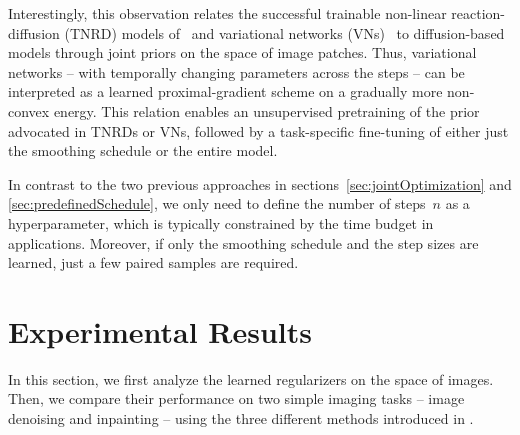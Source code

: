 \documentclass{article} %
\theoremstyle{plain}
\theoremstyle{definition}
\theoremstyle{remark}
\begin{document}
Interestingly, this observation relates the successful trainable non-linear reaction-diffusion (TNRD) models of~\citet{ChPo16} and variational networks (VNs)~\citep{KoKl17,HaKl18,EfKo20} to diffusion-based models through joint priors on the space of image patches.
Thus, variational networks -- with temporally changing parameters across the steps -- can be interpreted as a learned proximal-gradient scheme on a gradually more non-convex energy.
This relation enables an unsupervised pretraining of the prior advocated in TNRDs or VNs, followed by a task-specific fine-tuning of either just the smoothing schedule or the entire model.

In contrast to the two previous approaches in sections~\ref{sec:jointOptimization} and \ref{sec:predefinedSchedule}, we only need to define the number of steps~$n$ as a hyperparameter, which is typically constrained by the time budget in applications.
Moreover, if only the smoothing schedule and the step sizes are learned, just a few paired samples are required.


\section{Experimental Results}
In this section, we first analyze the learned regularizers on the space of images.
Then, we compare their performance on two simple imaging tasks -- image denoising and inpainting -- using the three different methods introduced in .
\end{document}
